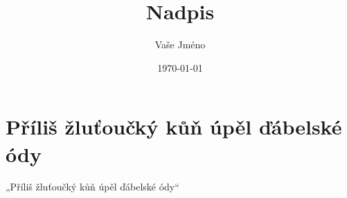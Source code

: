 \documentclass[a4paper]{article}
\title{Nadpis}
\author{Vaše Jméno}
\date{\today}
\begin{document}
\maketitle
\tableofcontents

\section{Příliš žluťoučký kůň úpěl ďábelské ódy}
„Příliš žluťoučký kůň úpěl ďábelské ódy“
\end{document}
